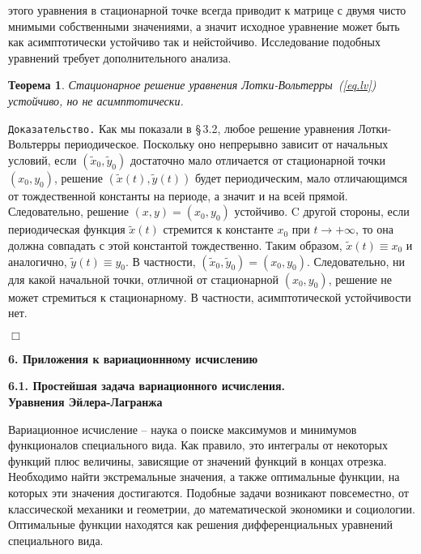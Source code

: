 \documentclass[12pt,a4paper]{article}
\newtheorem{theorem}{Теорема}
\begin{document}
этого уравнения в стационарной точке всегда приводит к матрице с двумя чисто мнимыми собственными значениями, а значит исходное уравнение может быть как асимптотически устойчиво так и нейстойчиво. Исследование подобных уравнений требует
дополнительного анализа.
\begin{theorem}\label{th.stab3}
Стационарное решение уравнения Лотки-Вольтерры~(\ref{eq.lv}) устойчиво, но не асимптотически.
\end{theorem}
{\tt Доказательство.} Как мы показали в \S \,3.2, любое решение уравнения Лотки-Вольтерры периодическое.
Поскольку оно непрерывно зависит от начальных условий, если $(\tilde x_0, \tilde y_0)$
достаточно мало отличается от стационарной точки $(x_0, y_0)$, решение $(\tilde x(t), \tilde y(t))$
будет периодическим, мало отличающимся от тождественной константы на периоде, а значит и на всей прямой.
Следовательно, решение $(x, y) = (x_0, y_0)$ устойчиво. C другой стороны, если периодическая функция
$\tilde x(t)$ стремится к константе $x_0$ при $t \to + \infty$, то она должна совпадать с этой константой тождественно.
Таким образом,  $\tilde x (t)
\equiv x_0$ и аналогично, $\tilde y(t) \equiv y_0$. В частности, $(\tilde x_0, \tilde y_0)  = (x_0, y_0)$.
Следовательно, ни для какой начальной точки, отличной от стационарной $(x_0, y_0)$,  решение не может стремиться к стационарному. В частности, асимптотической устойчивости нет.

   {\hfill $\Box$}
\bigskip


\bigskip

\begin{center}
\large{\textbf{6. Приложения к вариационнному исчислению}}
\end{center}

\bigskip

\begin{center}
\textbf{6.1. Простейшая задача вариационного исчисления. \\
Уравнения
 Эйлера-Лагранжа}
\end{center}
\bigskip

Вариационное исчисление -- наука о поиске максимумов и минимумов функционалов специального вида.
Как правило, это интегралы от некоторых функций плюс величины, зависящие от значений функций в концах отрезка.
Необходимо найти  экстремальные значения, а также оптимальные функции, на которых эти значения достигаются.
Подобные задачи возникают повсеместно, от классической механики и геометрии, до математической экономики и социологии.
Оптимальные  функции находятся как решения  дифференциальных  уравнений специального вида.
\end{document}
